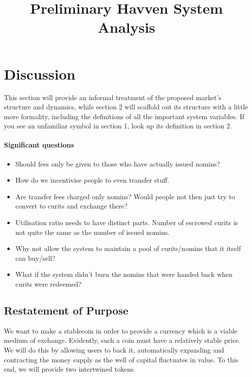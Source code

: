 \documentclass{article}
\begin{document}
\newcommand{\CUR}{\textsc{cur}}
\newcommand{\NOM}{\textsc{nom}}


\title{Preliminary Havven System Analysis}
\date{}

\begin{figure}
    \centering
    
\end{figure}
\maketitle

\section{Discussion}

This section will provide an informal treatment of the proposed market's structure
and dynamics, while section 2 will scaffold out its structure with a little more
formality, including the definitions of all the important system variables.
If you see an unfamiliar symbol in section 1, look up its definition in section 2.

\paragraph{Significant questions}
\begin{itemize}
    \item Should fees only be given to those who have actually issued nomins?
    \item How do we incentivise people to even transfer stuff.
    \item Are transfer fees charged only nomins? Would people not then just try to convert to curits and exchange there?
    \item Utilisation ratio needs to have distinct parts. Number of escrowed curits is not quite the same as the number of issued nomins.
    \item Why not allow the system to maintain a pool of curits/nomins that it itself can buy/sell?
    \item What if the system didn't burn the nomins that were handed back when curits were redeemed?
\end{itemize}

\pagebreak
\subsection{Restatement of Purpose}
We want to make a stablecoin in order to provide a currency which is a viable medium of exchange.
Evidently, such a coin must have a relatively stable price. We will do this by allowing users to back it,
automatically expanding and contracting the money supply as the well of capital fluctuates in value.
To this end, we will provide two intertwined tokens.
\end{document}
